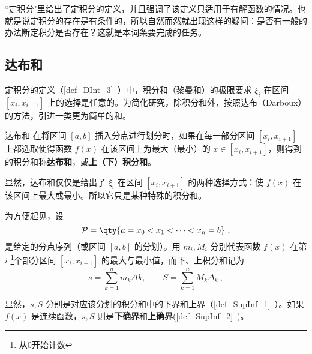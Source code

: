 
“定积分"里给出了定积分的定义，并且强调了该定义只适用于有解函数的情况。也就是说定积分的存在是有条件的，所以自然而然就出现这样的疑问：是否有一般的办法断定积分是否存在？这就是本词条要完成的任务。
\subsection{达布和}
定积分的定义（\autoref{def_DInt_3}~）中，积分和（黎曼和）的极限要求 $\xi_i$ 在区间 $[x_i,x_{i+1}]$ 上的选择是任意的。为简化研究，除积分和外，按照达布（Darboux）的方法，引进一类更为简单的和。
\begin{definition}{达布和}
在将区间 $[a,b]$ 插入分点进行划分时，如果在每一部分区间 $[x_i,x_{i+1}]$ 上都选取使得函数 $f(x)$ 在该区间上为最大（最小）的 $x\in[x_i,x_{i+1}]$，则得到的积分和称\textbf{达布和}，或\textbf{上（下）积分和}。
\end{definition}
显然，达布和仅仅是给出了 $\xi_i$ 在区间 $[x_i,x_{i+1}]$ 的两种选择方式：使 $f(x)$ 在该区间上最大或最小。所以它只是某种特殊的积分和。

为方便起见，设
\begin{equation}
\mathcal P = \qty{a = x_0 < x_1 < \dots < x_n = b}~,
\end{equation}
是给定的分点序列（或区间 $[a,b]$ 的分划）。用 $m_i,M_i$ 分别代表函数 $f(x)$ 在第 $i$ \footnote{从0开始计数}个部分区间 $[x_i,x_{i+1}]$ 的最大与最小值，而下、上积分和记为
\begin{equation}
s= \sum_{k = 1}^n m_k\Delta k, \qquad  S = \sum_{k = 1}^n M_k \Delta_k~,
\end{equation}

显然，$s,S$ 分别是对应该分划的积分和中的下界和上界（\autoref{def_SupInf_1}~）。如果 $f(x)$ 是连续函数，$s,S$ 则是\textbf{下确界}和\textbf{上确界}(\autoref{def_SupInf_2}~)。


